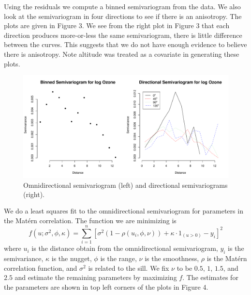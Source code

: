 \documentclass[12pt]{article}
\begin{document}
Using the residuals we compute a binned semivariogram from the data. We also look at the semivariogram in four directions to see if there is an anisotropy. The plots are given in Figure 3. We see from the right plot in Figure 3 that each direction produces more-or-less the same semivariogram, there is little difference between the curves. This suggests that we do not have enough evidence to believe there is anisotropy. Note altitude was treated as a covariate in generating these plots.

\begin{figure}[ht]
\begin{center}
\includegraphics[scale=0.5]{figs/variogram.pdf}
\end{center}
\caption{Omnidirectional semivariogram (left) and directional semivariograms (right).}
\end{figure}

We do a least squares fit to the omnidirectional semivariogram for parameters in the Mat{\'e}rn correlation. The function we are minimizing is
\[ f(u; \sigma^2,\phi,\kappa) = \sum_{i=1}^n\left[\sigma^2 (1 - \rho(u_i, \phi, \nu)) + \kappa\cdot 1_{(u>0)} - y_i\right]^2 \]
where $u_i$ is the distance obtain from the omnidirectional semivariogram, $y_i$ is the semivariance, $\kappa$ is the nugget, $\phi$ is the range, $\nu$ is the smoothness, $\rho$ is the Mat{\'e}rn correlation function, and $\sigma^2$ is related to the sill. We fix $\nu$ to be $0.5$, $1$, $1.5$, and $2.5$ and estimate the remaining parameters by maximizing $f$. The estimates for the parameters are shown in top left corners of the plots in Figure 4.
\end{document}
